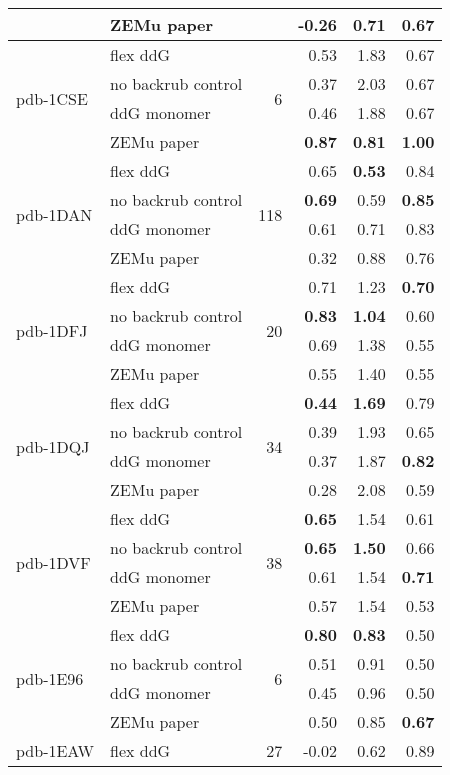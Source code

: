 {\begin{longtable}{llrrrr}
 & ZEMu paper & & -0.26 & 0.71 & \textbf{0.67}  \\
\hline
 \multirow{ 4}{*}{pdb-1CSE} & flex ddG & \multirow{ 4}{*}{6} & 0.53 & 1.83 & 0.67  \\
 & no backrub control & & 0.37 & 2.03 & 0.67  \\
 & ddG monomer & & 0.46 & 1.88 & 0.67  \\
 & ZEMu paper & & \textbf{0.87} & \textbf{0.81} & \textbf{1.00}  \\
\hline
 \multirow{ 4}{*}{pdb-1DAN} & flex ddG & \multirow{ 4}{*}{118} & 0.65 & \textbf{0.53} & 0.84  \\
 & no backrub control & & \textbf{0.69} & 0.59 & \textbf{0.85}  \\
 & ddG monomer & & 0.61 & 0.71 & 0.83  \\
 & ZEMu paper & & 0.32 & 0.88 & 0.76  \\
\hline
 \multirow{ 4}{*}{pdb-1DFJ} & flex ddG & \multirow{ 4}{*}{20} & 0.71 & 1.23 & \textbf{0.70}  \\
 & no backrub control & & \textbf{0.83} & \textbf{1.04} & 0.60  \\
 & ddG monomer & & 0.69 & 1.38 & 0.55  \\
 & ZEMu paper & & 0.55 & 1.40 & 0.55  \\
\hline
 \multirow{ 4}{*}{pdb-1DQJ} & flex ddG & \multirow{ 4}{*}{34} & \textbf{0.44} & \textbf{1.69} & 0.79  \\
 & no backrub control & & 0.39 & 1.93 & 0.65  \\
 & ddG monomer & & 0.37 & 1.87 & \textbf{0.82}  \\
 & ZEMu paper & & 0.28 & 2.08 & 0.59  \\
\hline
 \multirow{ 4}{*}{pdb-1DVF} & flex ddG & \multirow{ 4}{*}{38} & \textbf{0.65} & 1.54 & 0.61  \\
 & no backrub control & & \textbf{0.65} & \textbf{1.50} & 0.66  \\
 & ddG monomer & & 0.61 & 1.54 & \textbf{0.71}  \\
 & ZEMu paper & & 0.57 & 1.54 & 0.53  \\
\hline
 \multirow{ 4}{*}{pdb-1E96} & flex ddG & \multirow{ 4}{*}{6} & \textbf{0.80} & \textbf{0.83} & 0.50  \\
 & no backrub control & & 0.51 & 0.91 & 0.50  \\
 & ddG monomer & & 0.45 & 0.96 & 0.50  \\
 & ZEMu paper & & 0.50 & 0.85 & \textbf{0.67}  \\
\hline
 \multirow{ 4}{*}{pdb-1EAW} & flex ddG & \multirow{ 4}{*}{27} & -0.02 & 0.62 & 0.89  \\

\end{longtable}}
